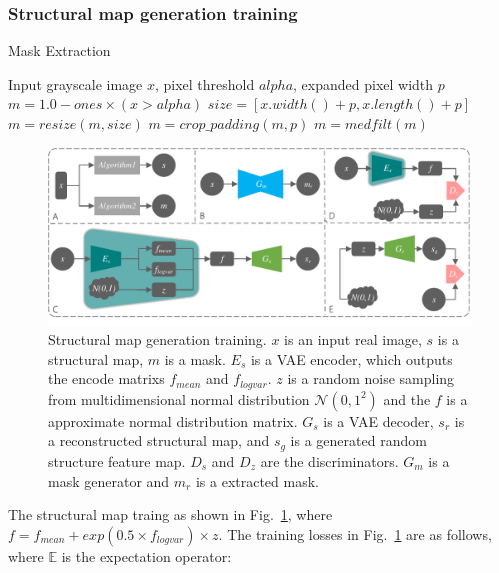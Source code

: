 \documentclass[runningheads]{llncs}
\begin{document}
\subsubsection{Structural map generation training}
\begin{algorithm}
	\caption{Mask Extraction}
	\label{alg:2}
	\begin{multicols}{2}
		\begin{algorithmic}[1]
			\State Input grayscale image $x$,  pixel threshold $alpha$, expanded pixel width $p$
			\State $m = 1.0 - ones \times (x > alpha)$
			\State $size=[x.width()+p, x.length()+p]$
			\State $m = resize(m, size)$
			\State $m = crop\_padding(m,p)$
			\State $m = medfilt(m)$
		\end{algorithmic}  
	\end{multicols}
\end{algorithm}
\begin{figure}
	\centering
	\includegraphics[width=0.98\columnwidth]{figures/feature_train}
	\caption{Structural map generation training. $x$ is an input real image, $s$ is a structural map, $m$ is a mask. $E_s$ is a VAE encoder, which outputs the encode matrixs $f_{mean}$ and $f_{logvar}$. $z$ is a random noise sampling from multidimensional normal distribution $\mathcal{N}(0,1^2)$ and the $f$ is a approximate normal distribution matrix. $G_s$ is a VAE decoder, $s_r$ is a reconstructed structural map, and $s_g$ is a generated random structure feature map. $D_{s}$ and $D_{z}$ are the discriminators. $G_m$ is a mask generator and $m_r$ is a extracted mask. }
	\label{feature_train}
\end{figure}
The structural map traing as shown in Fig.~\ref{feature_train}, where $f=f_{mean}+exp(0.5\times f_{logvar})\times z$. The training losses in Fig.~\ref{feature_train} are as follows, where $\mathbb{E}$ is the expectation operator: 
\end{document}
